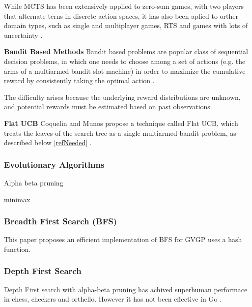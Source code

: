 \documentclass[journal]{IEEEtran}
\begin{document}
			While MCTS has been extensively applied to zero-sum games, with two players that alternate terns in discrete action spaces, it has also been aplied to orther domain types, such as single and multiplayer games, RTS and games with lots of uncertainty \cite{browne2012survey, de2016monte, frydenberg2015investigating}.

			\textbf{Bandit Based Methods}
				Bandit based problems are popular class of sequential decision problems, in which one needs to choose among a set of actions (e.g. the arms of a multiarmed bandit slot machine) in order to maximize the cumulative reward by consistently taking the optimal action \cite{kocsis2006bandit}.

				The difficulty arises because the underlying reward distributions are unknown, and potential rewards must be estimated based on past observations.
			
			\textbf{Flat UCB}
				Coquelin and Munos propose a technique called Flat UCB, which treats the leaves of the search tree as a single multiarmed bandit problem, as described below \ref{refNeeded} .

			

		








		\subsubsection{Evolutionary Algorithms} \label{sssec:num2}

		
		
		Alpha beta pruning
		
		minimax
		
		\subsubsection{Breadth First Search (BFS) }\label{sssec:BFS}
		This paper proposes an efficient implementation of BFS for GVGP \cite{EfficientBFS} uses a hash function.
		
		\subsubsection{Depth First Search}

		Depth First search with alpha-beta pruning \cite{knuth1975analysis} has achived superhuman performace in chess, checkers and orthello. However it has not been effective in Go \cite{silver2016mastering}.
		
\end{document}
